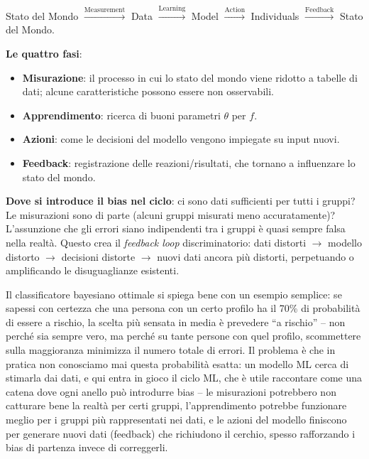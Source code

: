 \documentclass[a4paper,11pt]{article}
\begin{document}
\begin{definizione}[Ciclo ML]
Stato del Mondo $\xrightarrow{\text{Measurement}}$ Data $\xrightarrow{\text{Learning}}$ Model $\xrightarrow{\text{Action}}$ Individuals $\xrightarrow{\text{Feedback}}$ Stato del Mondo.
\end{definizione}

\textbf{Le quattro fasi}:
\begin{itemize}
  \item \textbf{Misurazione}: il processo in cui lo stato del mondo viene ridotto a tabelle di dati; alcune caratteristiche possono essere non osservabili.
  \item \textbf{Apprendimento}: ricerca di buoni parametri $\theta$ per $f$.
  \item \textbf{Azioni}: come le decisioni del modello vengono impiegate su input nuovi.
  \item \textbf{Feedback}: registrazione delle reazioni/risultati, che tornano a influenzare lo stato del mondo.
\end{itemize}

\textbf{Dove si introduce il bias nel ciclo}: ci sono dati sufficienti per tutti i gruppi? Le misurazioni sono di parte (alcuni gruppi misurati meno accuratamente)? L'assunzione che gli errori siano indipendenti tra i gruppi \`{e} quasi sempre falsa nella realt\`{a}. Questo crea il \emph{feedback loop} discriminatorio: dati distorti $\to$ modello distorto $\to$ decisioni distorte $\to$ nuovi dati ancora pi\`{u} distorti, perpetuando o amplificando le disuguaglianze esistenti.

\begin{nota}
Il classificatore bayesiano ottimale si spiega bene con un esempio semplice: se sapessi con certezza che una persona con un certo profilo ha il 70\% di probabilit\`{a} di essere a rischio, la scelta pi\`{u} sensata in media \`{e} prevedere ``a rischio'' -- non perch\'{e} sia sempre vero, ma perch\'{e} su tante persone con quel profilo, scommettere sulla maggioranza minimizza il numero totale di errori. Il problema \`{e} che in pratica non conosciamo mai questa probabilit\`{a} esatta: un modello ML cerca di stimarla dai dati, e qui entra in gioco il ciclo ML, che \`{e} utile raccontare come una catena dove ogni anello pu\`{o} introdurre bias -- le misurazioni potrebbero non catturare bene la realt\`{a} per certi gruppi, l'apprendimento potrebbe funzionare meglio per i gruppi pi\`{u} rappresentati nei dati, e le azioni del modello finiscono per generare nuovi dati (feedback) che richiudono il cerchio, spesso rafforzando i bias di partenza invece di correggerli.
\end{nota}
\end{document}
